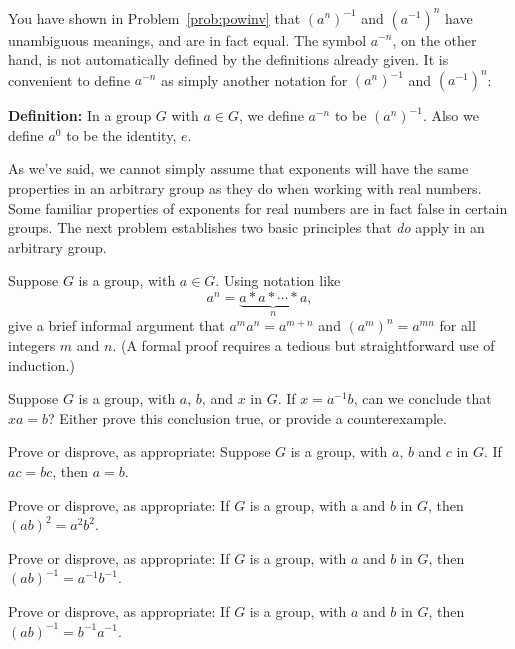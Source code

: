 You have shown in Problem~\ref{prob:powinv} that \((a^n)^{-1}\) and \((a^{-1})^n\) have unambiguous meanings, and are in fact equal. The symbol \(a^{-n}\), on the other hand, is not automatically defined by the definitions already given. It is convenient to define \(a^{-n}\) as simply another notation for \((a^n)^{-1}\) and \((a^{-1})^n\):

\textbf{Definition:} In a group \(G\) with \(a \in G\), we define \(a^{-n}\) to be \((a^n)^{-1}\). Also we define \(a^0\) to be the identity, \(e\).

As we've said, we cannot simply assume that exponents will have the same properties in an arbitrary group as they do when working with real numbers. Some familiar properties of exponents for real numbers are in fact false in certain groups. The next problem establishes two basic principles that \emph{do} apply in an arbitrary group.

\begin{problem}
Suppose \(G\) is a group, with \(a \in G\). Using notation like \[a^n = \underbrace{a * a * \cdots * a}_n, \] give a brief informal argument  that \(a^ma^n = a^{m+n}\) and \((a^m)^n = a^{mn}\) for all integers \(m\) and \(n\). (A formal proof requires a tedious but straightforward use of induction.)
\end{problem}

\begin{problem}
Suppose \(G\) is a group, with \(a\), \(b\), and \(x\) in \(G\). If \(x=a^{-1}b\), can we conclude that \(xa = b\)? Either prove this conclusion true, or provide a counterexample.
\end{problem}

\begin{problem}
Prove or disprove, as appropriate: Suppose \(G\) is a group, with \(a\), \(b\) and \(c\) in \(G\). If \(ac = bc\), then \(a = b\).
\end{problem}

\begin{problem}
Prove or disprove, as appropriate: If \(G\) is a group, with a and \(b\) in \(G\), then \((ab)^2 = a^2b^2\).
\end{problem}

\begin{problem}
Prove or disprove, as appropriate: If \(G\) is a group, with \(a\) and \(b\) in \(G\), then \((ab)^{-1} = a^{-1}b^{-1}\).
\end{problem}

\begin{problem}
Prove or disprove, as appropriate: If \(G\) is a group, with \(a\) and \(b\) in \(G\), then \((ab)^{-1} = b^{-1}a^{-1}\).
\end{problem}


